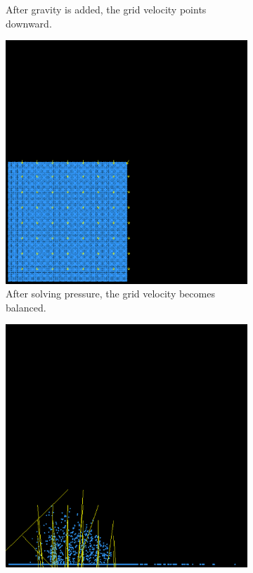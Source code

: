 \begin{figure}[h]
\begin{subfigure}[t]{0.2\textwidth}
      \caption{After gravity is added, the grid velocity points downward.}
  \end{subfigure}
  \hspace{1em}
  \begin{subfigure}[t]{0.2\textwidth}
    \includegraphics[width=\textwidth]{figures/pic_solve_pr.png}
    \caption{After solving pressure, the grid velocity becomes balanced.}
  \end{subfigure}
  \hspace{1em}
  \begin{subfigure}[t]{0.2\textwidth}
    \includegraphics[width=\textwidth]{figures/pic_interm.png}

\end{subfigure}
\end{figure}
